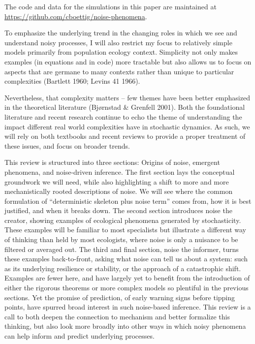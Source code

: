 \documentclass[
  authoryear,
  preprint]{elsarticle}
\begin{document}
The code and data for the simulations in this paper are maintained at
\url{https://github.com/cboettig/noise-phenomena}.

To emphasize the underlying trend in the changing roles in which we see
and understand noisy processes, I will also restrict my focus to
relatively simple models primarily from population ecology context.
Simplicity not only makes examples (in equations and in code) more
tractable but also allows us to focus on aspects that are germane to
many contexts rather than unique to particular complexities (Bartlett
1960; Levins 41 1966).

Nevertheless, that complexity matters -- few themes have been better
emphasized in the theoretical literature (Bjørnstad \& Grenfell 2001).
Both the foundational literature and recent research continue to echo
the theme of understanding the impact different real world complexities
have in stochastic dynamics. As such, we will rely on both textbooks and
recent reviews to provide a proper treatment of these issues, and focus
on broader trends.

This review is structured into three sections: Origins of noise,
emergent phenomena, and noise-driven inference. The first section lays
the conceptual groundwork we will need, while also highlighting a shift
to more and more mechanistically rooted descriptions of noise. We will
see where the common formulation of ``deterministic skeleton plus noise
term'' comes from, how it is best justified, and when it breaks down.
The second section introduces noise the creator, showing examples of
ecological phenomena generated by stochasticity. These examples will be
familiar to most specialists but illustrate a different way of thinking
than held by most ecologists, where noise is only a nuisance to be
filtered or averaged out. The third and final section, noise the
informer, turns these examples back-to-front, asking what noise can tell
us about a system: such as its underlying resilience or stability, or
the approach of a catastrophic shift. Examples are fewer here, and have
largely yet to benefit from the introduction of either the rigorous
theorems or more complex models so plentiful in the previous sections.
Yet the promise of prediction, of early warning signs before tipping
points, have spurred broad interest in such noise-based inference. This
review is a call to both deepen the connection to mechanism and better
formalize this thinking, but also look more broadly into other ways in
which noisy phenomena can help inform and predict underlying processes.
\end{document}
